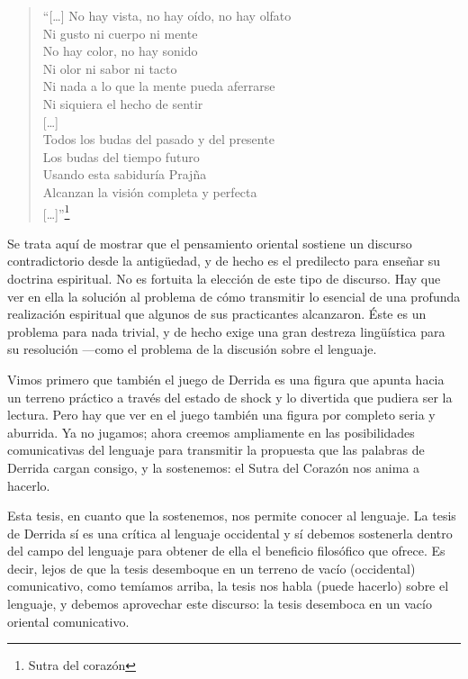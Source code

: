 \begin{quote}
``[\ldots{}] No hay vista, no hay oído, no
hay olfato \\
Ni gusto ni cuerpo ni mente \\
No hay color, no hay sonido \\
Ni olor ni sabor ni tacto \\
Ni nada a lo que la mente pueda aferrarse \\
Ni siquiera el hecho de sentir \\
{[}\ldots{}] \\
Todos los budas del pasado y del presente \\
Los budas del tiempo futuro \\
Usando esta sabiduría Prajña \\
Alcanzan la visión completa y perfecta \\
{[}\ldots{}]''\footnote{Sutra del corazón}
\end{quote}

Se trata aquí de mostrar que el pensamiento
oriental sostiene un discurso contradictorio
desde la antigüedad, y de hecho es el
predilecto para enseñar su doctrina
espiritual. No es fortuita la elección de
este tipo de discurso. Hay que ver en ella la
solución al problema de cómo transmitir lo
esencial de una profunda realización
espiritual que algunos de sus practicantes
alcanzaron. Éste es un problema para nada
trivial, y de hecho exige una gran destreza
lingüística para su resolución ---como el
problema de la discusión sobre el lenguaje.

Vimos primero que también el juego de Derrida
es una figura que apunta hacia un terreno
práctico a través del estado de shock y lo
divertida que pudiera ser la lectura. Pero
hay que ver en el juego también una figura
por completo seria y aburrida. Ya no jugamos;
ahora creemos ampliamente en las
posibilidades comunicativas del lenguaje para
transmitir la propuesta que las palabras de
Derrida cargan consigo, y la sostenemos: el
Sutra del Corazón nos anima a hacerlo.

Esta tesis, en cuanto que la sostenemos, nos
permite conocer al lenguaje. La tesis de
Derrida sí es una crítica al lenguaje
occidental y sí debemos sostenerla dentro del
campo del lenguaje para obtener de ella el
beneficio filosófico que ofrece. Es decir,
lejos de que la tesis desemboque en un
terreno de vacío (occidental) comunicativo,
como temíamos arriba, la tesis nos habla
(puede hacerlo) sobre el lenguaje, y debemos
aprovechar este discurso: la tesis desemboca
en un vacío oriental comunicativo.

